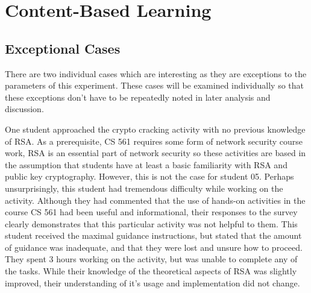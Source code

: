 


\section{Content-Based Learning}
    \subsection{Exceptional Cases}
        There are two individual cases which are interesting as they are exceptions to the parameters of this experiment. These cases will be examined individually so that these exceptions don't have to be repeatedly noted in later analysis and discussion. 

        One student approached the crypto cracking activity with no previous knowledge of RSA. As a prerequisite, CS 561 requires some form of network security course work, RSA is an essential part of network security so these activities are based in the assumption that students have at least a basic familiarity with RSA and public key cryptography. However, this is not the case for student 05. Perhaps unsurprisingly, this student had tremendous difficulty while working on the activity. Although they had commented that the use of hands-on activities in the course CS 561 had been useful and informational, their responses to the survey clearly demonstrates that this particular activity was not helpful to them. This student received the maximal guidance instructions, but stated that the amount of guidance was inadequate, and that they were lost and unsure how to proceed. They spent 3 hours working on the activity, but was unable to complete any of the tasks. While their knowledge of the theoretical aspects of RSA was slightly improved, their understanding of it's usage and implementation did not change. 

